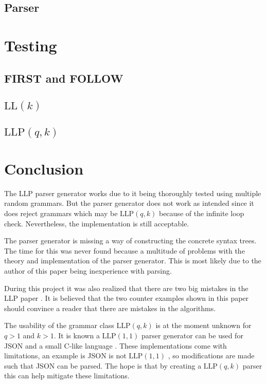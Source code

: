 \documentclass[a4paper,12pt]{article}
\newcommand\LL{\text{LL}}
\newcommand\LLP{\text{LLP}}
\theoremstyle{definition}
\begin{document}
\subsection{Parser}


\section{Testing}
\subsection{FIRST and FOLLOW}


\subsection{\texorpdfstring{$\LL(k)$}{TEXT}}


\subsection{\texorpdfstring{$\LLP(q,k)$}{TEXT}}


\newpage
\section{Conclusion}
The LLP parser generator works due to it being thoroughly tested using multiple random grammars. But the parser generator does not work as intended since it does reject grammars which may be $\LLP(q,k)$ because of the infinite loop check. Nevertheless, the implementation is still acceptable.

The parser generator is missing a way of constructing the concrete syntax trees. The time for this was never found because a multitude of problems with the theory and implementation of the parser generator. This is most likely due to the author of this paper being inexperience with parsing.

During this project it was also realized that there are two big mistakes in the LLP paper \cite{Vagner2007}. It is believed that the two counter examples shown in this paper should convince a reader that there are mistakes in the algorithms.

The usability of the grammar class $\LLP(q, k)$ is at the moment unknown for $q > 1$ and $k > 1$. It is known a $\LLP(1, 1)$ parser generator can be used for JSON and a small C-like language \cite{voetter2021}. These implementations come with limitations, an example is JSON is not $\LLP(1, 1)$ \cite[60]{voetter2021}, so modifications are made such that JSON can be parsed. The hope is that by creating a $\LLP(q, k)$ parser this can help mitigate these limitations.

\printbibliography
\end{document}

